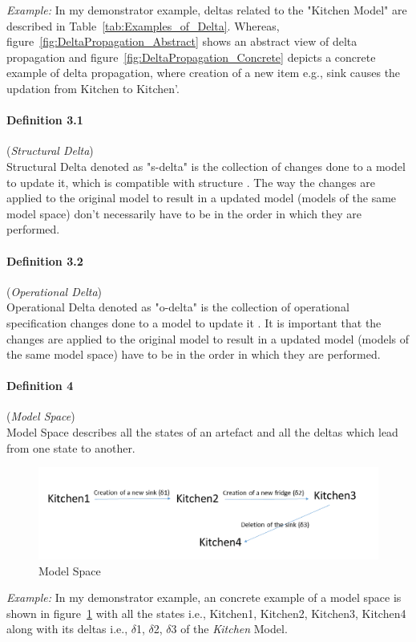 \textit{Example:} In my demonstrator example, deltas related to the "Kitchen Model" are described in Table~\ref{tab:Examples_of_Delta}. Whereas, figure~\ref{fig:DeltaPropagation_Abstract} shows an abstract view of delta propagation and figure~\ref{fig:DeltaPropagation_Concrete} depicts a concrete example of delta propagation, where creation of a new item e.g., sink causes the updation from Kitchen to Kitchen'.

\paragraph{Definition 3.1} (\textit{Structural Delta})\\ 
Structural Delta denoted as "s-delta" is the collection of changes done to a model to update it, which is compatible with structure \cite{benchmarx-reload}. The way the changes are applied to the original model to result in a updated model (models of the same model space) don't necessarily have to be in the order in which they are performed. 

\paragraph{Definition 3.2} (\textit{Operational Delta})\\  
Operational Delta denoted as "o-delta" is the collection of operational specification changes done to a model to update it \cite{benchmarx-reload}. It is important that the changes are applied to the original model to result in a updated model (models of the same model space) have to be in the order in which they are performed. 

\paragraph{Definition 4} (\textit{Model Space})\\
Model Space describes all the states of an artefact and all the deltas which lead from one state to another.
\begin{figure}
	\includegraphics[width=1\textwidth]{figures/Model_Space}
	\caption{Model Space}
	\label{fig:Model_Space}
\end{figure}
\newline\newline\textit{Example:} In my demonstrator example, an concrete example of a model space is shown in figure~\ref{fig:Model_Space} with all the states i.e., Kitchen1, Kitchen2, Kitchen3, Kitchen4 along with its deltas i.e., $\delta$1, $\delta$2, $\delta$3 of the \textit{Kitchen} Model.

